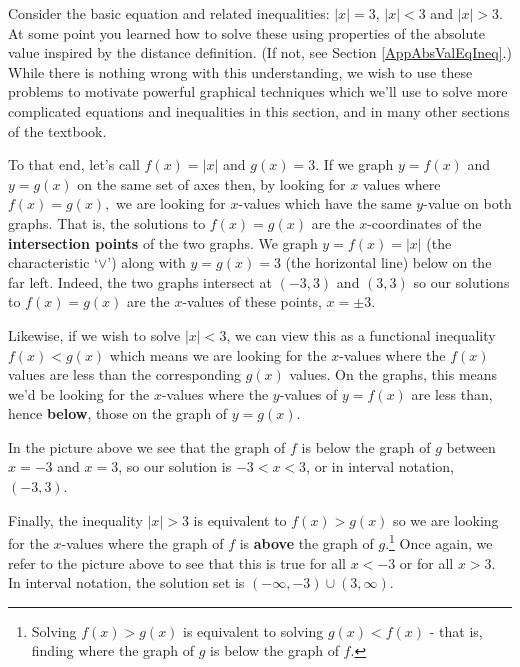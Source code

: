 \documentclass{ximera}
\begin{document}
Consider the basic equation and related inequalities: $|x| = 3$, $|x| < 3$ and $|x| > 3$.  At some point you learned  how to solve these using properties of the absolute value inspired by the distance definition. (If not, see Section \ref{AppAbsValEqIneq}.)   While there is nothing wrong with this understanding, we wish to use these problems to motivate powerful graphical techniques which we'll use to solve more complicated equations and inequalities in this section, and in many other sections of the textbook.    



To that end, let's call $f(x)  = |x|$ and $g(x) = 3$. If we graph $y = f(x)$ and $y = g(x)$ on the same set of axes then, by looking for $x$ values where $f(x) = g(x),$ we are looking for $x$-values which have the same $y$-value on both graphs. That is, the solutions to $f(x) = g(x)$ are the $x$-coordinates of the \textbf{intersection points} of the two graphs.  We graph $y = f(x) = |x|$ (the characteristic `$\vee$') along with $y = g(x) = 3$ (the horizontal line) below on the far left.  Indeed, the two graphs intersect at $(-3, 3)$ and $(3, 3)$ so our solutions to $f(x) = g(x)$ are the $x$-values of these points, $x = \pm 3$.    

\begin{center}
\end{center}

Likewise, if we wish to solve $|x| < 3$, we can view this as a functional inequality $f(x) < g(x)$ which means we are looking for the $x$-values where the $f(x)$ values are less than the corresponding $g(x)$ values.  On the graphs, this means we'd be looking for the $x$-values where the $y$-values of $y = f(x)$ are less than, hence \textbf{below}, those on the graph of $y = g(x)$.  

\medskip

In the picture above we see that the graph of $f$ is below the graph of $g$ between $x = -3$ and $x = 3$, so our solution is $-3 < x < 3$, or in interval notation, $(-3, 3)$.   

Finally, the inequality $|x| > 3$ is equivalent to $f(x) > g(x)$ so we are looking for the $x$-values where the graph of $f$ is \textbf{above} the graph of $g$.\footnote{Solving $f(x) > g(x)$ is equivalent to solving $g(x) < f(x)$ - that is, finding where the graph of $g$ is below the graph of $f$.} Once again, we refer to the picture above to see that this is true for all $x < -3$ or for all $x > 3$.  In interval notation, the solution set is $(-\infty, -3) \cup (3, \infty)$.
\end{document}
